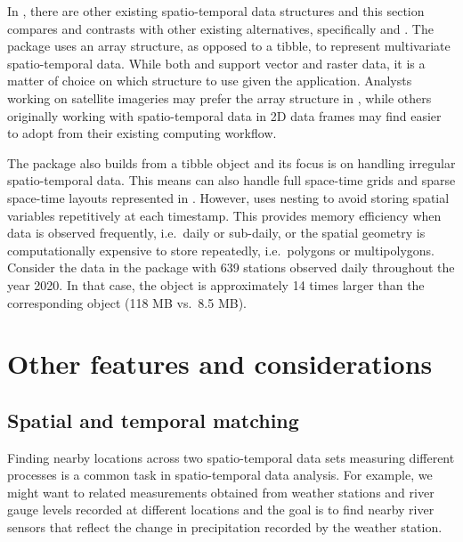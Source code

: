\documentclass[
  shortnames]{jss}
\begin{document}
In , there are other existing spatio-temporal data structures and this section compares and contrasts  with other existing alternatives, specifically  and . The  package \citep{stars} uses an array structure, as opposed to a tibble, to represent multivariate spatio-temporal data. While both  and  support vector and raster data, it is a matter of choice on which structure to use given the application. Analysts working on satellite imageries may prefer the array structure in , while others originally working with spatio-temporal data in 2D data frames may find  easier to adopt from their existing computing workflow.

The  package \citep{sftime} also builds from a tibble object and its focus is on handling irregular spatio-temporal data. This means  can also handle full space-time grids and sparse space-time layouts represented in . However,  uses nesting to avoid storing spatial variables repetitively at each timestamp. This provides memory efficiency when data is observed frequently, i.e.~daily or sub-daily, or the spatial geometry is computationally expensive to store repeatedly, i.e.~polygons or multipolygons. Consider the  data in the  package with 639 stations observed daily throughout the year 2020. In that case, the  object is approximately 14 times larger than the corresponding  object (118 MB vs.~8.5 MB).

\hypertarget{others}{%
\section{Other features and considerations}\label{others}}

\hypertarget{matching}{%
\subsection{Spatial and temporal matching}\label{matching}}

Finding nearby locations across two spatio-temporal data sets measuring different processes is a common task in spatio-temporal data analysis. For example, we might want to related measurements obtained from weather stations and river gauge levels recorded at different locations and the goal is to find nearby river sensors that reflect the change in precipitation recorded by the weather station.
\end{document}
